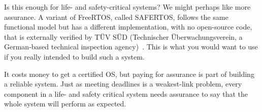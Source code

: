 Is this enough for life- and safety-critical systems? We might perhaps like more assurance. A variant of FreeRTOS, called SAFERTOS, follows the same functional model but has a different implementation, with no open-source code, that is externally verified by T\"UV S\"UD (Technischer \"Uberwachungsverein, a German-based technical inspection agency)~\cite{safertos}. This is what you would want to use if you really intended to build such a system. 

It costs money to get a certified OS, but paying for assurance is part of building a reliable system. Just as meeting deadlines is a weakest-link problem, every component in a life- and safety critical system needs assurance to say that the whole system will perform as expected.





